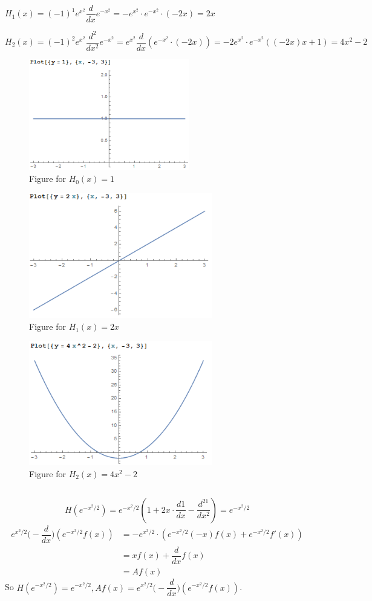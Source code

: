 \documentclass[a4paper,12pt,titlepage]{article}
\begin{document}
$H_1(x)=(-1)^1e^{x^2}\dfrac{d}{dx}e^{-x^2}=-e^{x^2}\cdot e^{-x^2}\cdot(-2x)=2x$

$H_2(x)=(-1)^2e^{x^2}\dfrac{d^2}{dx^2}e^{-x^2}=e^{x^2}\dfrac{d}{dx} (e^{-x^2}\cdot(-2x))=-2e^{x^2}\cdot e^{-x^2}((-2x)x+1)=4x^2-2$

\begin{figure}[H]
    \centering
    \includegraphics[width=7cm]{1.png}
    \caption{Figure for $H_0(x)=1$}
\end{figure}

\begin{figure}[H]
    \centering
    \includegraphics[width=8cm]{2.png}
    \caption{Figure for $H_1(x)=2x$}
\end{figure}
\begin{figure}[H]
    \centering
    \includegraphics[width=8cm]{3.png}
    \caption{Figure for $H_2(x)=4x^2-2$}
\end{figure}

\subsection{}
$$H(e^{-x^2/2})=e^{-x^2/2}(1+2x\cdot\dfrac{d1}{dx}-\dfrac{d^21}{dx^2})=e^{-x^2/2}$$
\begin{align*}
e^{x^2/2}\Big(-\dfrac{d}{dx}\Big)(e^{-x^2/2}f(x))&=-e^{x^2/2}\cdot(e^{-x^2/2}(-x)f(x)+e^{-x^2/2}f'(x))\\&
=xf(x)+\dfrac{d}{dx}f(x)\\
&=Af(x)
\end{align*}
So $H(e^{-x^2/2})=e^{-x^2/2},Af(x)=e^{x^2/2}\Big(-\dfrac{d}{dx}\Big)(e^{-x^2/2}f(x))$.
\end{document}
